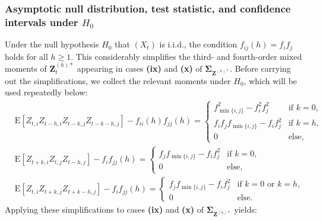 ﻿\documentclass[12pt,a4paper]{scrreprt}
\theoremstyle{definition}
\begin{document}
\subsubsection{Asymptotic null distribution, test statistic, and
confidence intervals under $H_0$}
Under the null hypothesis $H_0$ that $(X_t)$ is i.i.d., the condition 
$f_{ij}(h) = f_i f_j$ holds for all $h \geq 1$. This considerably 
simplifies the third- and fourth-order mixed moments of 
$\boldsymbol{Z}^{(h)*}_t$ appearing in cases \textbf{(ix)} and 
\textbf{(x)} of $\boldsymbol{\Sigma}_{\boldsymbol{Z}^{(h)*}}$. Before 
carrying out the simplifications, we collect the relevant moments under 
$H_0$, which will be used repeatedly below:
\begin{align*}
    &\mathrm{E}[Z_{t,i}Z_{t-h,i}Z_{t-k,j}Z_{t-k-h,j}]
    - f_{ii}(h)f_{jj}(h) = \begin{cases}
        f^2_{\min\{i,j\}} - f_i^2f_j^2 & \text{if } k = 0,\\
        f_i f_j f_{\min\{i,j\}} - f_i f_j^2 & \text{if } k = h,\\
        0 & \text{else,}
    \end{cases}\\[1ex]
    &\mathrm{E}[Z_{t+k, i}Z_{t,j}Z_{t-h,j}] - f_if_{jj}(h) = \begin{cases}
        f_jf_{\min\{i,j\}} - f_i f_j^2 & \text{if } k = 0, \\
        0 & \text{else,}
    \end{cases}\\[1ex]
    &\mathrm{E}[Z_{t, i}Z_{t+k,j}Z_{t+k-h, j}] - f_i f_{jj}(h) = \begin{cases}
        f_jf_{\min\{i,j\}} - f_i f_j^2 & \text{if } k = 0 \text{ or } k = h, \\
        0 & \text{else.}
    \end{cases}
\end{align*}
Applying these simplifications to cases \textbf{(ix)} and \textbf{(x)} 
of $\boldsymbol{\Sigma}_{\boldsymbol{Z}^{(h)*}}$ yields:
\end{document}
